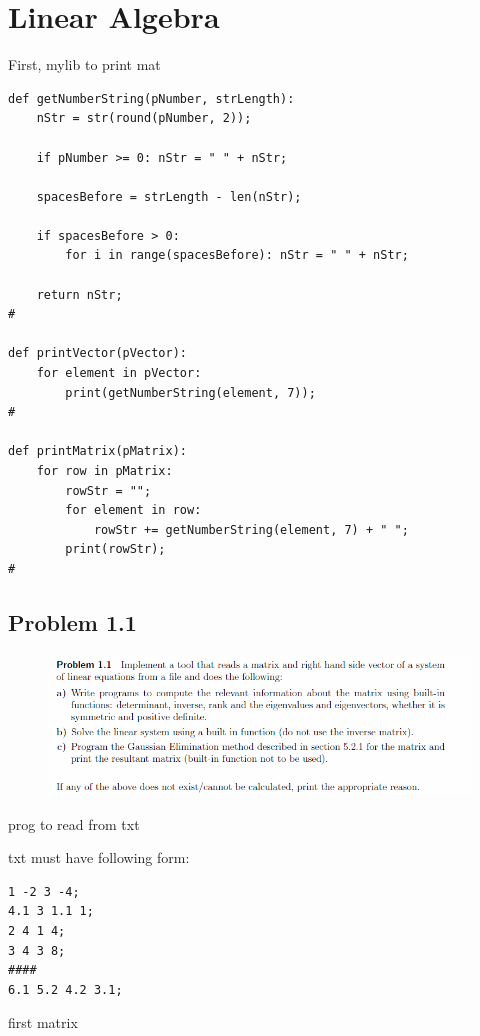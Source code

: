 \section{Linear Algebra}

First, mylib to print mat


\begin{lstlisting}[caption=mylib script to properly print vectors and matrices]
def getNumberString(pNumber, strLength):
	nStr = str(round(pNumber, 2));
	
	if pNumber >= 0: nStr = " " + nStr;
	
	spacesBefore = strLength - len(nStr);
	
	if spacesBefore > 0:
		for i in range(spacesBefore): nStr = " " + nStr;
	
	return nStr;
#

def printVector(pVector):
    for element in pVector:
		print(getNumberString(element, 7));
#

def printMatrix(pMatrix):
	for row in pMatrix:
		rowStr = "";
		for element in row:
			rowStr += getNumberString(element, 7) + " ";
		print(rowStr);
#
\end{lstlisting}


\subsection{Problem 1.1}


\begin{figure}[!ht]
\includegraphics[width=1\textwidth]{chapters/images/desc-1-1}
\end{figure}




prog to read from txt

txt must have following form:

\begin{lstlisting}
1 -2 3 -4;
4.1 3 1.1 1;
2 4 1 4;
3 4 3 8;
####
6.1 5.2 4.2 3.1;
\end{lstlisting}

first matrix

